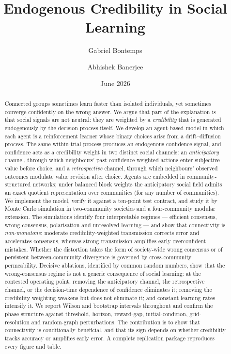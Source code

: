 \documentclass[11pt]{article}
\title{\bfseries Endogenous Credibility in Social Learning}
\author{Gabriel Bontemps \and Abhishek Banerjee}
\date{June 2026}
\newcommand{\1}{\mathbf{1}}
\begin{document}
\maketitle

\begin{abstract}
\noindent
Connected groups sometimes learn faster than isolated individuals, yet
sometimes converge confidently on the wrong answer. We argue that part of the
explanation is that social signals are not neutral: they are weighted by a
\emph{credibility} that is generated endogenously by the decision process
itself. We develop an agent-based model in which each agent is a reinforcement
learner whose binary choices arise from a drift--diffusion process. The same
within-trial process produces an endogenous confidence signal, and confidence
acts as a credibility weight in two distinct social channels: an
\emph{anticipatory} channel, through which neighbours' past confidence-weighted
actions enter subjective value before choice, and a \emph{retrospective}
channel, through which neighbours' observed outcomes modulate value revision
after choice. Agents are embedded in community-structured networks; under
balanced block weights the anticipatory social field admits an exact quotient
representation over communities (for any number of communities). We implement the
model, verify it against a ten-point test contract, and study it by Monte Carlo
simulation in two-community societies and a four-community modular extension. The
simulations identify four interpretable regimes
--- efficient consensus, wrong consensus, polarisation and unresolved learning
--- and show that connectivity is \emph{non-monotone}: moderate
credibility-weighted transmission corrects error and accelerates consensus,
whereas strong transmission amplifies early overconfident mistakes. Whether the
distortion takes the form of society-wide wrong consensus or of persistent
between-community divergence is governed by cross-community permeability.
Decisive ablations, identified by common random numbers, show that the
wrong-consensus regime is not a generic consequence of social learning: at the
contested operating point, removing the anticipatory channel, the retrospective
channel, or the decision-time dependence of confidence eliminates it; removing
the credibility weighting weakens but does not eliminate it; and constant
learning rates intensify it. We report Wilson and bootstrap intervals throughout
and confirm the phase structure against threshold, horizon, reward-gap,
initial-condition, grid-resolution and random-graph perturbations. The
contribution is to show that connectivity is conditionally beneficial, and that
its sign depends on whether credibility tracks accuracy or amplifies early
error. A complete replication package reproduces every figure and table.
\end{abstract}
\end{document}
